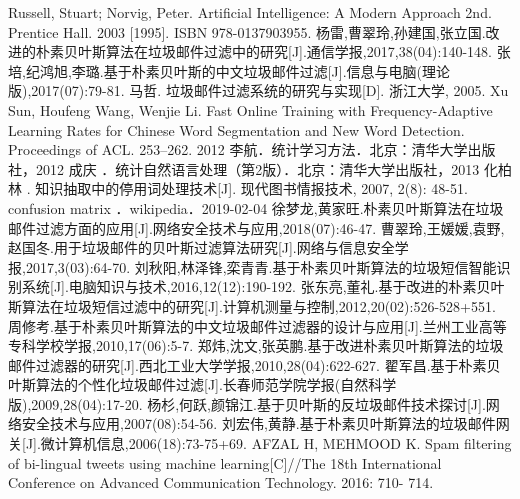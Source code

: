 \documentclass[UTF8]{ctexart}
\begin{document}
\begin{thebibliography}{99}
	Russell, Stuart; Norvig, Peter. Artificial Intelligence: A Modern Approach 2nd. Prentice Hall. 2003 [1995]. ISBN 978-0137903955.
	杨雷,曹翠玲,孙建国,张立国.改进的朴素贝叶斯算法在垃圾邮件过滤中的研究[J].通信学报,2017,38(04):140-148.
	张培,纪鸿旭,李璐.基于朴素贝叶斯的中文垃圾邮件过滤[J].信息与电脑(理论版),2017(07):79-81.
	马哲. 垃圾邮件过滤系统的研究与实现[D]. 浙江大学, 2005.
	Xu Sun, Houfeng Wang, Wenjie Li. Fast Online Training with Frequency-Adaptive Learning Rates for Chinese Word Segmentation and New Word Detection. Proceedings of ACL. 253–262. 2012
	李航．统计学习方法．北京：清华大学出版社，2012
	成庆 ．统计自然语言处理（第2版）．北京：清华大学出版社，2013
	化柏林	. 知识抽取中的停用词处理技术[J]. 现代图书情报技术, 2007, 2(8): 48-51.	
	confusion matrix  ．wikipedia．2019-02-04
	徐梦龙,黄家旺.朴素贝叶斯算法在垃圾邮件过滤方面的应用[J].网络安全技术与应用,2018(07):46-47.
	曹翠玲,王媛媛,袁野,赵国冬.用于垃圾邮件的贝叶斯过滤算法研究[J].网络与信息安全学报,2017,3(03):64-70.
	刘秋阳,林泽锋,栾青青.基于朴素贝叶斯算法的垃圾短信智能识别系统[J].电脑知识与技术,2016,12(12):190-192.
	张东亮,董礼.基于改进的朴素贝叶斯算法在垃圾短信过滤中的研究[J].计算机测量与控制,2012,20(02):526-528+551.
	周修考.基于朴素贝叶斯算法的中文垃圾邮件过滤器的设计与应用[J].兰州工业高等专科学校学报,2010,17(06):5-7.
	郑炜,沈文,张英鹏.基于改进朴素贝叶斯算法的垃圾邮件过滤器的研究[J].西北工业大学学报,2010,28(04):622-627.
	翟军昌.基于朴素贝叶斯算法的个性化垃圾邮件过滤[J].长春师范学院学报(自然科学版),2009,28(04):17-20.
	杨杉,何跃,颜锦江.基于贝叶斯的反垃圾邮件技术探讨[J].网络安全技术与应用,2007(08):54-56.
	刘宏伟,黄静.基于朴素贝叶斯算法的垃圾邮件网关[J].微计算机信息,2006(18):73-75+69.
	AFZAL H, MEHMOOD K. Spam filtering of bi-lingual tweets using
machine learning[C]//The 18th International Conference on Advanced
Communication Technology. 2016: 710- 714.
\end{thebibliography}
\end{document}
